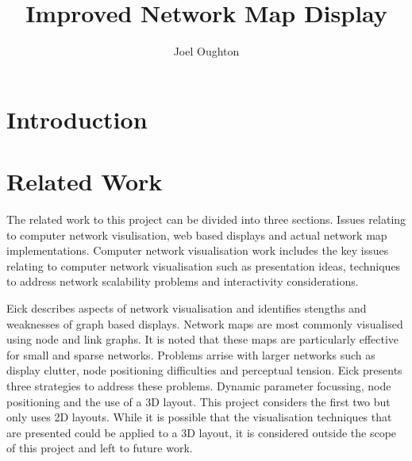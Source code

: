 \documentclass{article}
\title{Improved Network Map Display}
\author{Joel Oughton}
\date{}
\begin{document}
\maketitle

\begin{abstract}

\end{abstract}

\section{Introduction}
\label{sec:introduction}

\section{Related Work}
\label{sec:related-work}


The related work to this project can be divided into three sections. Issues
relating to computer network visulisation, web based displays and actual network
map implementations. Computer network visualisation work includes the key issues
relating to computer network visualisation such as presentation ideas,
techniques to address network scalability problems and interactivity
considerations.

Eick describes aspects of network visualisation and identifies stengths and
weaknesses of graph based displays.\cite{Eick_1996} Network maps are most
commonly visualised using node and link graphs. It is noted that these maps are
particularly effective for small and sparse networks. Problems arrise with
larger networks such as display clutter, node positioning difficulties and
perceptual tension. Eick presents three strategies to address these problems.
Dynamic parameter focussing, node positioning and the use of a 3D layout. This
project considers the first two but only uses 2D layouts. While it is possible
that the visualisation techniques that are presented could be applied to a 3D
layout, it is considered outside the scope of this project and left to future
work.
\end{document}
